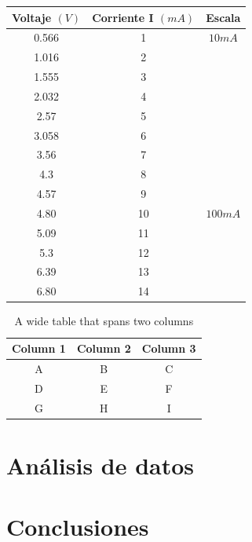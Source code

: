\documentclass[letterpaper, 12pt]{report}
\begin{document}
\begin{table}[H]
    \begin{tabular}{ccc}
		\label{tabla-resistor 1ra Medicion}
        \toprule
        Voltaje $(V)$ & Corriente I $(mA)$ & Escala  \\
        \midrule
        0.566         & 1                  & $10mA$  \\
        1.016         & 2                  &         \\
        1.555         & 3                  &         \\
        2.032         & 4                  &         \\
        2.57          & 5                  &         \\
        3.058         & 6                  &         \\
        3.56          & 7                  &         \\
        4.3           & 8                  &         \\ %
        4.57          & 9                  &         \\ 
        \midrule
        4.80          & 10                 & $100mA$ \\
        5.09          & 11                 &         \\
        5.3           & 12                 &         \\
        6.39          & 13                 &         \\
        6.80          & 14                 &         \\
        \bottomrule
    \end{tabular}
\end{table}

\begin{table}[H]
	\centering
	\caption{A wide table that spans two columns}
	\begin{tabular}{ccc}
	  \toprule
	  Column 1 & Column 2 & Column 3 \\
	  \midrule
	  A        & B        & C        \\
	  D        & E        & F        \\
	  G        & H        & I        \\
	  \bottomrule
	\end{tabular}
  \end{table}

\section{Análisis de datos}




\section{Conclusiones}

\newpage


\end{document}
